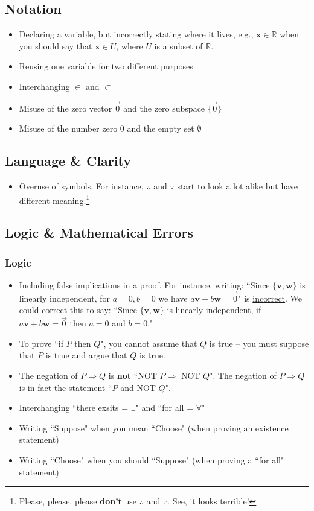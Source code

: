 \documentclass[11pt]{amsart}
\newcommand\R{\mathbb R}    %
\begin{document}
\subsection*{Notation}
\begin{itemize}
	\item Declaring a variable, but incorrectly stating where it lives, e.g., $\bm{x} \in \R$ when you should say that $\bm{x} \in U$, where $U$ is a subset of $\R$.
	\item Reusing one variable for two different purposes
	\item Interchanging $\in$ and $\subset$
	\item Misuse of the zero vector $\vec{0}$ and the zero subspace $\{\vec{0}\}$
	\item Misuse of the number zero $0$ and the empty set $\emptyset$
\end{itemize}


\subsection*{Language \& Clarity}
\begin{itemize}
	\item Overuse of symbols.  For instance, $\therefore$ and $\because$ start to look a lot alike but have different meaning.\footnote{Please, please, please \textbf{don't} use $\therefore$ and $\because$.  See, it looks terrible!}
\end{itemize}

\subsection*{Logic \& Mathematical Errors}

\subsubsection*{Logic}
\begin{itemize}
	\item Including false implications in a proof.  For instance, writing: ``Since $\{\bm{v},\bm{w}\}$ is linearly independent, for $a=0,b=0$ we have $a\bm{v} + b\bm{w} = \vec{0}$" is \underline{incorrect}.  We could correct this to say: ``Since $\{\bm{v},\bm{w}\}$ is linearly independent, if $a\bm{v} + b\bm{w} = \vec{0}$ then $a=0$ and $b=0$."
	\item To prove ``if $P$ then $Q$", you cannot assume that $Q$ is true -- you must suppose that $P$ is true and argue that $Q$ is true.
	\item The negation of $P \Rightarrow Q$ is \textbf{not} ``NOT $P \Rightarrow$ NOT $Q$".  The negation of $P \Rightarrow Q$ is in fact the statement ``$P$ and NOT $Q$".
	\item Interchanging ``there exsits = $\exists$" and ``for all = $\forall$"
	\item Writing ``Suppose" when you mean ``Choose" (when proving an existence statement)
	\item Writing ``Choose" when you should ``Suppose" (when proving a ``for all" statement)
\end{itemize}
\end{document}
